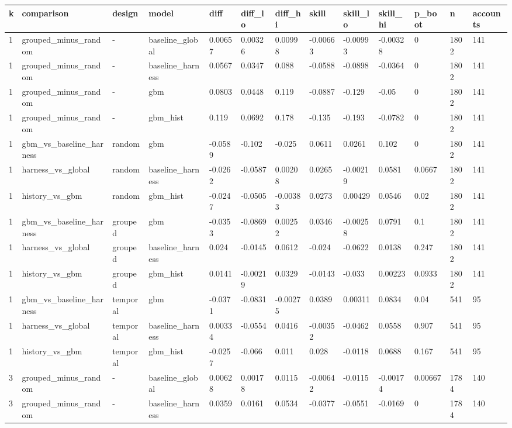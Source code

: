 \begin{tabular}{lllllllllllll}
\toprule
k & comparison & design & model & diff & diff\_lo & diff\_hi & skill & skill\_lo & skill\_hi & p\_boot & n & accounts \\
\midrule
1 & grouped\_minus\_random & - & baseline\_global & 0.00657 & 0.00326 & 0.00998 & -0.00663 & -0.00993 & -0.00328 & 0 & 1802 & 141 \\
1 & grouped\_minus\_random & - & baseline\_harness & 0.0567 & 0.0347 & 0.088 & -0.0588 & -0.0898 & -0.0364 & 0 & 1802 & 141 \\
1 & grouped\_minus\_random & - & gbm & 0.0803 & 0.0448 & 0.119 & -0.0887 & -0.129 & -0.05 & 0 & 1802 & 141 \\
1 & grouped\_minus\_random & - & gbm\_hist & 0.119 & 0.0692 & 0.178 & -0.135 & -0.193 & -0.0782 & 0 & 1802 & 141 \\
1 & gbm\_vs\_baseline\_harness & random & gbm & -0.0589 & -0.102 & -0.025 & 0.0611 & 0.0261 & 0.102 & 0 & 1802 & 141 \\
1 & harness\_vs\_global & random & baseline\_harness & -0.0262 & -0.0587 & 0.00208 & 0.0265 & -0.00219 & 0.0581 & 0.0667 & 1802 & 141 \\
1 & history\_vs\_gbm & random & gbm\_hist & -0.0247 & -0.0505 & -0.00383 & 0.0273 & 0.00429 & 0.0546 & 0.02 & 1802 & 141 \\
1 & gbm\_vs\_baseline\_harness & grouped & gbm & -0.0353 & -0.0869 & 0.00252 & 0.0346 & -0.00258 & 0.0791 & 0.1 & 1802 & 141 \\
1 & harness\_vs\_global & grouped & baseline\_harness & 0.024 & -0.0145 & 0.0612 & -0.024 & -0.0622 & 0.0138 & 0.247 & 1802 & 141 \\
1 & history\_vs\_gbm & grouped & gbm\_hist & 0.0141 & -0.00219 & 0.0329 & -0.0143 & -0.033 & 0.00223 & 0.0933 & 1802 & 141 \\
1 & gbm\_vs\_baseline\_harness & temporal & gbm & -0.0371 & -0.0831 & -0.00275 & 0.0389 & 0.00311 & 0.0834 & 0.04 & 541 & 95 \\
1 & harness\_vs\_global & temporal & baseline\_harness & 0.00334 & -0.0554 & 0.0416 & -0.00352 & -0.0462 & 0.0558 & 0.907 & 541 & 95 \\
1 & history\_vs\_gbm & temporal & gbm\_hist & -0.0257 & -0.066 & 0.011 & 0.028 & -0.0118 & 0.0688 & 0.167 & 541 & 95 \\
3 & grouped\_minus\_random & - & baseline\_global & 0.00628 & 0.00178 & 0.0115 & -0.00642 & -0.0115 & -0.00174 & 0.00667 & 1784 & 140 \\
3 & grouped\_minus\_random & - & baseline\_harness & 0.0359 & 0.0161 & 0.0534 & -0.0377 & -0.0551 & -0.0169 & 0 & 1784 & 140 \\

\end{tabular}
